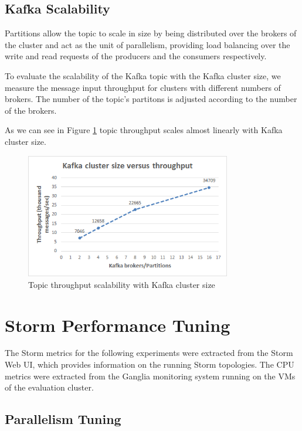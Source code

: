 \subsection{Kafka Scalability}

Partitions allow the topic to scale in size by being distributed over the brokers of the cluster and act as the unit of parallelism, providing load balancing over the write and read requests of the producers and the consumers respectively.

To evaluate the scalability of the Kafka topic with the Kafka cluster size, we measure the message input throughput for clusters with different numbers of brokers. The number of the topic's partitons is adjusted according to the number of the brokers.

As we can see in Figure \ref{figure:benchmarks_kafka_scalability} topic throughput scales almost linearly with Kafka cluster size.

\begin{figure}[H]
\centering
\includegraphics[width=0.8\textwidth]{figures/benchmarks_kafka_scalability}
\caption{Topic throughput scalability with Kafka cluster size}
\label{figure:benchmarks_kafka_scalability}
\end{figure}


\section{Storm Performance Tuning}

The Storm metrics for the following experiments were extracted from the Storm Web UI, which provides information on the running Storm topologies. The CPU metrics were extracted from the Ganglia monitoring system \cite{ganglia} running on the VMs of the evaluation cluster.

\subsection{Parallelism Tuning}\label{subsection:benchmarks_storm_tuning}

